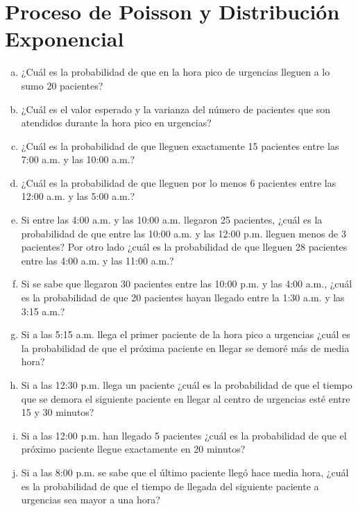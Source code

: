 \documentclass[11pt, spanish]{article}
\begin{document}
\pagebreak
\section{Proceso de Poisson y Distribución Exponencial}

\begin{enumerate}[(a)]

\item ¿Cuál es la probabilidad de que en la hora pico de urgencias lleguen a lo sumo 20
pacientes?

\item ¿Cuál es el valor esperado y la varianza del número de pacientes que son
atendidos durante la hora pico en urgencias?

\item ¿Cuál es la probabilidad de que lleguen exactamente 15 pacientes entre las 7:00
a.m. y las 10:00 a.m.?

\item ¿Cuál es la probabilidad de que lleguen por lo menos 6 pacientes entre las 12:00
a.m. y las 5:00 a.m.?

\item Si entre las 4:00 a.m. y las 10:00 a.m. llegaron 25 pacientes, ¿cuál es la
probabilidad de que entre las 10:00 a.m. y las 12:00 p.m. lleguen menos de 3 pacientes? Por
otro lado ¿cuál es la probabilidad de que lleguen 28 pacientes entre las 4:00 a.m. y las 11:00
a.m.?

\item Si se sabe que llegaron 30 pacientes entre las 10:00 p.m. y las 4:00 a.m., ¿cuál
es la probabilidad de que 20 pacientes hayan llegado entre la 1:30 a.m. y las 3:15 a.m.?

\item Si a las 5:15 a.m. llega el primer paciente de la hora pico a urgencias ¿cuál es la
probabilidad de que el próxima paciente en llegar se demoré más de media hora?

\item Si a las 12:30 p.m. llega un paciente ¿cuál es la probabilidad de que el tiempo que
se demora el siguiente paciente en llegar al centro de urgencias esté entre 15 y 30 minutos?

\item Si a las 12:00 p.m. han llegado 5 pacientes ¿cuál es la probabilidad de que el
próximo paciente llegue exactamente en 20 minutos?

\item Si a las 8:00 p.m. se sabe que el último paciente llegó hace media hora, ¿cuál es
la probabilidad de que el tiempo de llegada del siguiente paciente a urgencias sea mayor a
una hora?

\end{enumerate}
\end{document}
